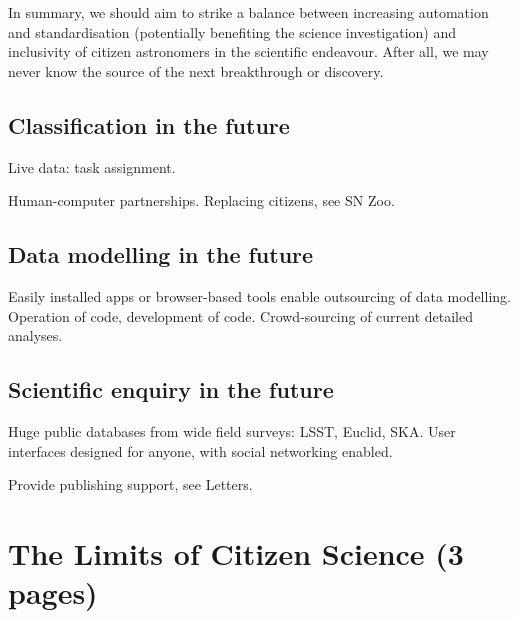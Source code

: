 \documentclass{ar2e}
\begin{document}
In summary, we should aim to strike a balance between increasing automation
and standardisation (potentially benefiting the science investigation) and
inclusivity of citizen astronomers in the scientific endeavour.  After all, we
may never know the source of the next breakthrough or discovery.








\subsection{Classification in the future}
\label{sec:future:class}

Live data: task assignment. 

Human-computer partnerships. Replacing citizens, see SN Zoo.



\subsection{Data modelling in the future}
\label{sec:future:models}

Easily installed apps or browser-based tools enable outsourcing of data
modelling. Operation of code, development of code. Crowd-sourcing of current
detailed analyses.



\subsection{Scientific enquiry in the future}
\label{sec:future:enquiry}

Huge public databases from wide field surveys: LSST, Euclid, SKA. User
interfaces designed for anyone, with social networking enabled. 

Provide publishing support, see Letters.



\section{The Limits of Citizen Science (3 pages)}
\label{sec:limits}
\end{document}
